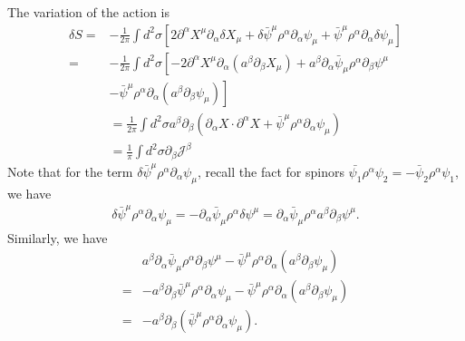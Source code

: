 \documentclass[graybox,envcountchap,sectrefs]{svmono}
\begin{document}
The variation of the action is
\begin{align}
\delta S =&-\frac{1}{2 \pi} \int d^{2} \sigma\left[2 \partial^{\alpha} X^{\mu} \partial_{\alpha} \delta X_{\mu}+\delta \bar{\psi}^{\mu} \rho^{\alpha} \partial_{\alpha} \psi_{\mu}+\bar{\psi}^{\mu} \rho^{\alpha} \partial_{\alpha} \delta\psi_{\mu}\right] \nonumber \\
=&-\frac{1}{2 \pi} \int d^{2} \sigma\left[-2 \partial^{\alpha} X^{\mu} \partial_{\alpha}\left(a^{\beta} \partial_{\beta} X_{\mu}\right)+a^{\beta} \partial_{\alpha} \bar{\psi}_{\mu} \rho^{\alpha} \partial_{\beta} \psi^{\mu}\right.\nonumber\\
&\left.-\bar{\psi}^{\mu} \rho^{\alpha} \partial_{\alpha}\left(a^{\beta} \partial_{\beta} \psi_{\mu}\right)\right] \nonumber\\
&=\frac{1}{2 \pi} \int d^{2} \sigma a^{\beta} \partial_{\beta}\left(\partial_{\alpha} X\cdot \partial^{\alpha} X+\bar{\psi}^{\mu} \rho^{\alpha} \partial_{\alpha} \psi_{\mu}\right) \nonumber\\
&=\frac{1}{\pi} \int d^{2} \sigma \partial_{\beta} \mathcal{J}^{\beta}
\end{align}
Note that for the term $\delta \bar{\psi}^{\mu} \rho^{\alpha} \partial_{\alpha} \psi_{\mu}$, recall the fact for spinors $\bar{\psi_1}\rho^{\alpha}\psi_2=-\bar{\psi}_2\rho^{\alpha}\psi_1$, we have
\begin{align}
	\delta \bar{\psi}^{\mu} \rho^{\alpha} \partial_{\alpha} \psi_{\mu}=-\partial_{\alpha} \bar{\psi}_{\mu} \rho^{\alpha} \delta \psi^{\mu}=\partial_{\alpha} \bar{\psi}_{\mu} \rho^{\alpha} a^{\beta}\partial_{\beta}\psi^{\mu}.
\end{align}
Similarly, we have
\begin{align}
&a^{\beta} \partial_{\alpha} \bar{\psi}_{\mu} \rho^{\alpha} \partial_{\beta} \psi^{\mu}	
-\bar{\psi}^{\mu} \rho^{\alpha} \partial_{\alpha}\left(a^{\beta} \partial_{\beta} \psi_{\mu}\right)\nonumber\\
=&-a^{\beta}\partial_{\beta}\bar{\psi}^{\mu}\rho^{\alpha}\partial_{\alpha}\psi_{\mu}
-\bar{\psi}^{\mu} \rho^{\alpha} \partial_{\alpha}\left(a^{\beta} \partial_{\beta} \psi_{\mu}\right)\nonumber\\
=&-a^{\beta}\partial_{\beta}\left(\bar{\psi}^{\mu} \rho^{\alpha} \partial_{\alpha} \psi_{\mu} \right).
\end{align}
\end{document}
